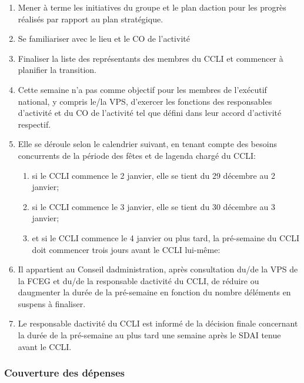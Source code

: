 \begin{enumerate}
 \item
  Mener à terme les initiatives du groupe et le plan d\textquotesingle action pour les progrès réalisés par rapport au plan stratégique.
 \item
  Se familiariser avec le lieu et le CO de l'activité
 \item
  Finaliser la liste des représentants des membres du CCLI et commencer à planifier la transition.
 \item
  Cette semaine n'a pas comme objectif pour les membres de l'exécutif national, y compris le/la VPS, d'exercer les fonctions des responsables d'activité et du CO de l'activité tel que défini dans leur accord d'activité respectif.
 \item
  Elle se déroule selon le calendrier suivant, en tenant compte des besoins concurrents de la période des fêtes et de l\textquotesingle agenda chargé du CCLI:

  \begin{enumerate}
   \item
    si le CCLI commence le 2 janvier, elle se tient du 29 décembre au 2 janvier;
   \item
    si le CCLI commence le 3 janvier, elle se tient du 30 décembre au 3 janvier;
   \item
    et si le CCLI commence le 4 janvier ou plus tard, la pré-semaine du CCLI doit commencer trois jours avant le CCLI lui-même:
  \end{enumerate}

 \item
  Il appartient au Conseil d\textquotesingle administration, après consultation du/de la VPS de la FCEG et du/de la responsable d\textquotesingle activité du CCLI, de réduire ou d\textquotesingle augmenter la durée de la pré-semaine en fonction du nombre d\textquotesingle éléments en suspens à finaliser.
 \item
  Le responsable d\textquotesingle activité du CCLI est informé de la décision finale concernant la durée de la pré-semaine au plus tard une semaine après le SDAI tenue avant le CCLI.
\end{enumerate}

\subsubsection{Couverture des dépenses}
\label{couverture-des-depenses}

